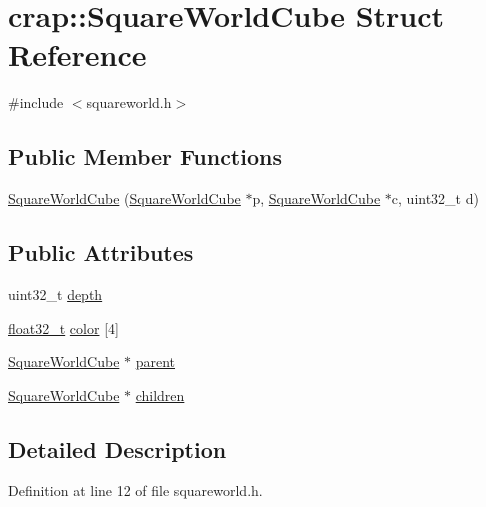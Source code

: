 \hypertarget{structcrap_1_1_square_world_cube}{\section{crap\+:\+:Square\+World\+Cube Struct Reference}
\label{structcrap_1_1_square_world_cube}
}


{\ttfamily \#include $<$squareworld.\+h$>$}

\subsection*{Public Member Functions}
\begin{DoxyCompactItemize}
\item 
\hyperlink{structcrap_1_1_square_world_cube_ae8060c3287dfb9ace41ca0c6903a1670}{Square\+World\+Cube} (\hyperlink{structcrap_1_1_square_world_cube}{Square\+World\+Cube} $\ast$p, \hyperlink{structcrap_1_1_square_world_cube}{Square\+World\+Cube} $\ast$c, uint32\+\_\+t d)
\end{DoxyCompactItemize}
\subsection*{Public Attributes}
\begin{DoxyCompactItemize}
\item 
uint32\+\_\+t \hyperlink{structcrap_1_1_square_world_cube_ace5f01b725ba2900714f1114e8d58ccf}{depth}
\item 
\hyperlink{crap__types_8h_a4611b605e45ab401f02cab15c5e38715}{float32\+\_\+t} \hyperlink{structcrap_1_1_square_world_cube_a40225fc4b5138dcb9b0fe58c882774c0}{color} \mbox{[}4\mbox{]}
\item 
\hyperlink{structcrap_1_1_square_world_cube}{Square\+World\+Cube} $\ast$ \hyperlink{structcrap_1_1_square_world_cube_adf6b00d13203e191b4056f3e64f51582}{parent}
\item 
\hyperlink{structcrap_1_1_square_world_cube}{Square\+World\+Cube} $\ast$ \hyperlink{structcrap_1_1_square_world_cube_acf9b60edb49483c7b5e7cd80fb35668a}{children}
\end{DoxyCompactItemize}


\subsection{Detailed Description}


Definition at line 12 of file squareworld.\+h.



